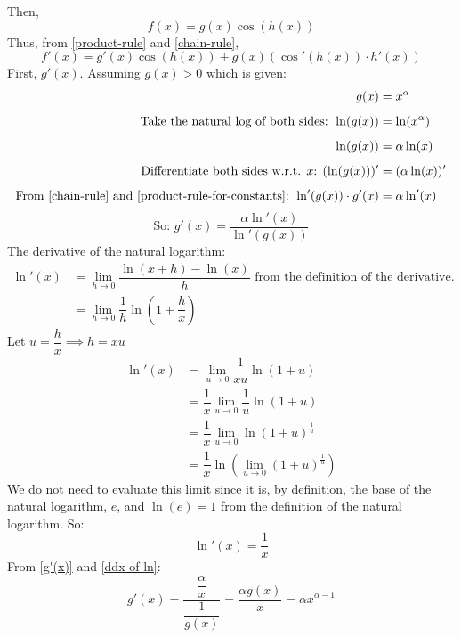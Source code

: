\documentclass{article}
\begin{document}
Then,
\begin{equation}
	f(x) = g(x) \cos(h(x)) \label{exercise1.1.1}
\end{equation}
Thus, from \cref{product-rule} and \cref{chain-rule},
\begin{equation}
	f'(x)=g'(x)\cos(h(x)) + g(x)(\cos'(h(x))\cdot h'(x)) \label{exercise1.1-fprime}
\end{equation}
First, $g'(x)$. Assuming $g(x)>0$ which is given:
\begin{align*}
	g(x)                                                                                       & = x^{\alpha}       \\[0.5em]
	\text{Take the natural log of both sides: }\ln(g(x))                                       & = \ln(x^{\alpha})  \\[0.5em]
	\ln(g(x))                                                                                  & = \alpha \ln(x)    \\[0.5em]
	\text{Differentiate both sides w.r.t. $x$: }(\ln(g(x)))'                                   & = (\alpha \ln(x))' \\[0.5em]
	\text{From \cref{chain-rule} and \cref{product-rule-for-constants}: }\ln'(g(x))\cdot g'(x) & = \alpha \ln'(x)
\end{align*}
\begin{equation}
	\text{So: }g'(x)=\dfrac{\alpha \ln'(x)}{\ln'(g(x))} \label{g'(x)}
\end{equation}
The derivative of the natural logarithm:
\begin{align*}
	\ln'(x) & = \lim_{h \to 0}\dfrac{\ln(x+h)-\ln(x)}{h} \text{ from the definition of the derivative.} \\[0.5em]
	        & = \lim_{h \to 0} \dfrac1h \ln\left( 1 + \dfrac{h}{x} \right)
\end{align*}
Let $ u= \dfrac{h}{x} \implies h = xu$
\begin{align*}
	\ln'(x) & = \lim_{u \to 0} \dfrac{1}{xu} \ln(1+u)             \\[0.5em]
	        & = \dfrac{1}{x} \lim_{u \to 0} \dfrac{1}{u} \ln(1+u) \\[0.5em]
	        & = \dfrac{1}{x} \lim_{u \to 0} \ln(1+u)^{\frac1u}    \\[0.5em]
	        & = \dfrac{1}{x} \ln(\lim_{u \to 0}(1+u)^{\frac1u})
\end{align*}
We do not need to evaluate this limit since it is, by definition, the base of the natural logarithm, $e$, and $\ln(e)=1$ from the definition
of the natural logarithm. So:
\begin{equation}
	\ln'(x)=\dfrac{1}{x} \label{ddx-of-ln}
\end{equation}
From \cref{g'(x)} and \cref{ddx-of-ln}:
\begin{equation}
	g'(x)=\dfrac{\dfrac{\alpha}{x}}{\dfrac{1}{g(x)}}=\dfrac{\alpha g(x)}{x}=\alpha x^{\alpha-1} \label{product-rule-for-any-power}
\end{equation}
\end{document}
